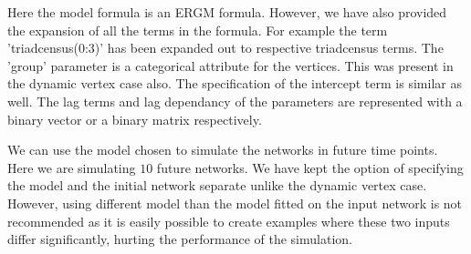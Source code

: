 \documentclass[12pt]{article}\usepackage[]{graphicx}\usepackage[]{color}
\begin{document}
Here the model formula is an ERGM formula. However, we have also provided the expansion of all the terms in the formula. For example the term 'triadcensus(0:3)' has been expanded out to respective triadcensus terms. The 'group' parameter is a categorical attribute for the vertices. This was present in the dynamic vertex case also. The specification of the intercept term is similar as well. The lag terms and lag dependancy of the parameters are represented with a binary vector or a binary matrix respectively.

We can use the model chosen to simulate the networks in future time points. Here we are simulating $10$ future networks. We have kept the option of specifying the model and the initial network separate unlike the dynamic vertex case. However, using different model than the model fitted on the input network is not recommended as it is easily possible to create examples where these two inputs differ significantly, hurting the performance of the simulation.
\end{document}
